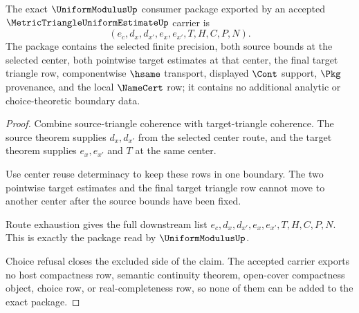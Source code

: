 \begin{theorem}
\label{thm:metric-triangle-uniform-estimate-uniform-modulus-exact-package}
The exact $\UniformModulusUp$ consumer package exported by an accepted $\MetricTriangleUniformEstimateUp$ carrier is
$$
(e_c,d_x,d_{x'},e_x,e_{x'},T,H,C,P,N).
$$
The package contains the selected finite precision, both source bounds at the selected center, both pointwise target estimates at that center, the final target triangle row, componentwise $\hsame$ transport, displayed $\Cont$ support, $\Pkg$ provenance, and the local $\NameCert$ row; it contains no additional analytic or choice-theoretic boundary data.
\end{theorem}
\begin{proof}
Combine source-triangle coherence with target-triangle coherence. The source theorem supplies $d_x,d_{x'}$ from the selected center route, and the target theorem supplies $e_x,e_{x'}$ and $T$ at the same center.

Use center reuse determinacy to keep these rows in one boundary. The two pointwise target estimates and the final target triangle row cannot move to another center after the source bounds have been fixed.

Route exhaustion gives the full downstream list $e_c,d_x,d_{x'},e_x,e_{x'},T,H,C,P,N$. This is exactly the package read by $\UniformModulusUp$.

Choice refusal closes the excluded side of the claim. The accepted carrier exports no host compactness row, semantic continuity theorem, open-cover compactness object, choice row, or real-completeness row, so none of them can be added to the exact package.
\end{proof}

